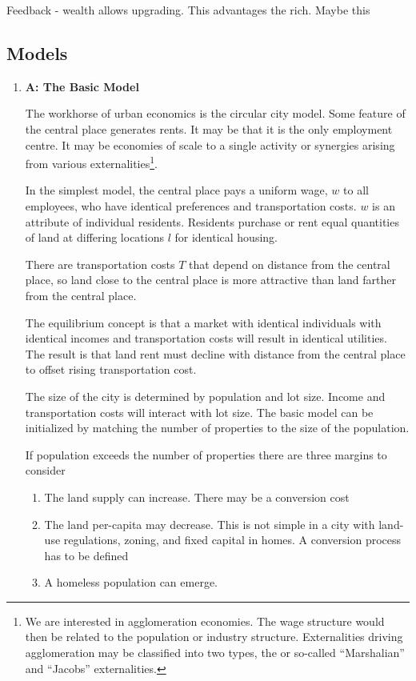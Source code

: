 \documentclass[preview, 12pt]{standalone}
\begin{document}
Feedback - wealth  allows  upgrading. This advantages the rich. Maybe this 


\subsection{Models}
\begin{enumerate}
\item \textbf{A: The Basic Model}

The workhorse of urban economics is the circular city model. Some feature of the central place generates rents. It may be that it is the only employment centre. It may be economies of scale to a single activity or synergies arising from various externalities\footnote{We are interested in agglomeration economies. The wage  structure would then be related to the population or industry  structure. Externalities driving agglomeration may be classified  into two types, the  or so-called ``Marshalian''  and ``Jacobs'' externalities.}. 


In the simplest model, the central place pays a uniform wage, $w$ to all employees, who have identical preferences and transportation costs. $w$ is an attribute of individual residents. Residents  purchase or rent equal quantities of land at differing locations $l$ for identical housing.  

There are transportation costs $T$ that depend on distance from the  central place, so land close to the central place is more attractive than land farther from the central place.  

The equilibrium concept is that a market with identical individuals with identical incomes and transportation costs will result in identical utilities. The result is that land rent must decline with distance from the central place to offset rising transportation cost. 

The size of the city is determined by population and lot size. Income and transportation costs will interact with lot size. The basic model can be initialized by matching the number of properties to the size of the population. 

If population exceeds the number of properties there are three margins to consider
	\begin{enumerate}
		\item The land supply can increase. There may be a conversion cost
		\item The land per-capita may decrease. This is not simple in a city with land-use regulations, zoning, and fixed capital in homes. A conversion process has to be defined
		\item A homeless population can emerge. 
	\end{enumerate}
	



\end{enumerate}
\end{document}
